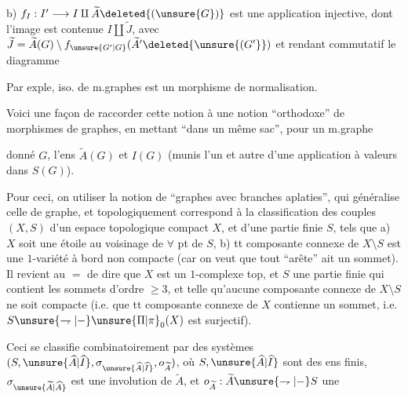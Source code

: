 
b) $f_I:I'\longrightarrow I\amalg\widetilde A\deleted{(\unsure{G})}$ est une application injective, dont l'image est contenue $I\amalg\widetilde J$, avec $\widetilde J=\widetilde A(G)\setminus f_{\unsure{G'|G}}(\widetilde A'\deleted{\unsure{(G'}})$ et rendant commutatif le diagramme

Par exple, iso. de m.graphes est un morphisme de normalisation. 

Voici une façon de raccorder cette notion à une notion ``orthodoxe'' de morphismes de graphes, en mettant ``dans un même sac'', pour un m.graphe

donné $G$, l'ens $\widetilde A(G)$ et $I(G)$ (munis l'un et autre d'une application  à valeurs dans $S(G)$).

Pour ceci, on  utiliser la notion de ``graphes avec branches aplaties'', qui généralise celle de graphe, et topologiquement correspond à la classification des  couples $(X,S)$ d'un espace topologique compact $X$, et d'une partie finie $S$, tels que a) $X$ soit une étoile au voisinage de $\forall$ pt de $S$,  b)  tt composante connexe de $X\setminus S$ est une $1$-variété à bord non compacte (car on veut que tout  ``arête'' ait un sommet). Il revient au $=$ de dire que $X$ est un $1$-complexe top, et $S$ une partie finie qui contient les sommets d'ordre $\geq3$, et telle qu'aucune composante connexe de $X\setminus S$ ne soit compacte (i.e. que tt composante connexe de $X$ contienne un sommet, i.e. $S\unsure{\rightharpoondown|{-}}\unsure{\Pi|\pi}_0(X)$ est surjectif).

Ceci se classifie combinatoirement par des systèmes $(S,\unsure{\widehat A|\widehat I},\sigma_{\unsure{\widehat A|\widehat I}},o_{\widetilde A})$, où  $S,\unsure{\widehat A|\widehat I}$ sont des ens finis, $\sigma_{\unsure{\widetilde A|\widehat A}}$ est une involution de $\widetilde A$, et $o_{\widetilde A}:\widetilde A\unsure{\rightharpoondown|{-}}S$ une

